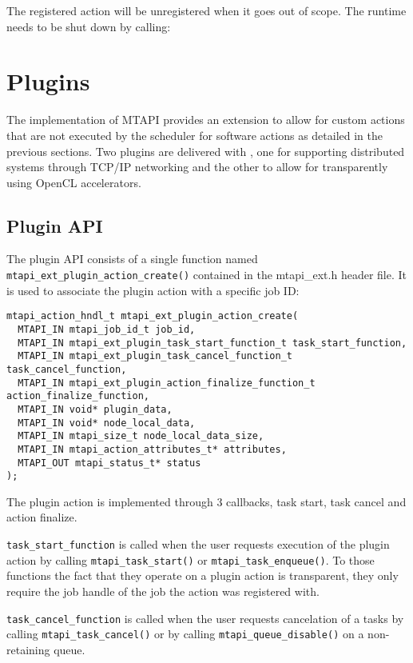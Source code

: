 The registered action will be unregistered when it goes out of scope.
The runtime needs to be shut down by calling:
\\

\section{Plugins}

The \embb implementation of MTAPI provides an extension to allow for custom actions that are not executed by the scheduler for software actions as detailed in the previous sections.
Two plugins are delivered with \embb, one for supporting distributed systems through TCP/IP networking and the other to allow for transparently using OpenCL accelerators.

\subsection{Plugin API}

The plugin API consists of a single function named \lstinline|mtapi_ext_plugin_action_create()| contained in the mtapi\_ext.h header file. It is used to associate the plugin action with a specific job ID:
\begin{lstlisting}
mtapi_action_hndl_t mtapi_ext_plugin_action_create(
  MTAPI_IN mtapi_job_id_t job_id,
  MTAPI_IN mtapi_ext_plugin_task_start_function_t task_start_function,
  MTAPI_IN mtapi_ext_plugin_task_cancel_function_t task_cancel_function,
  MTAPI_IN mtapi_ext_plugin_action_finalize_function_t action_finalize_function,
  MTAPI_IN void* plugin_data,
  MTAPI_IN void* node_local_data,
  MTAPI_IN mtapi_size_t node_local_data_size,
  MTAPI_IN mtapi_action_attributes_t* attributes,
  MTAPI_OUT mtapi_status_t* status
);
\end{lstlisting}
The plugin action is implemented through 3 callbacks, task start, task cancel and action finalize.

\lstinline|task_start_function| is called when the user requests execution of the plugin action by calling \lstinline|mtapi_task_start()| or \lstinline|mtapi_task_enqueue()|. To those functions the fact that they operate on a plugin action is transparent, they only require the job handle of the job the action was registered with.

\lstinline|task_cancel_function| is called when the user requests cancelation of a tasks by calling \lstinline|mtapi_task_cancel()| or by calling \lstinline|mtapi_queue_disable()| on a non-retaining queue.

